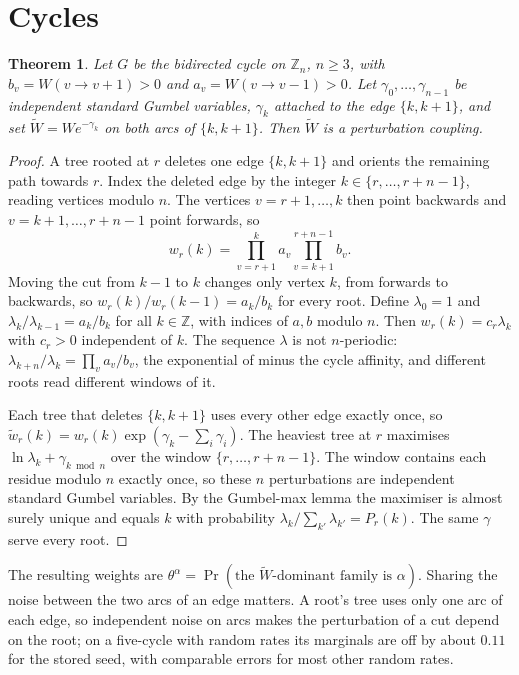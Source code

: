 \documentclass[11pt]{amsart}
\newtheorem{theorem}{Theorem}[section]
\theoremstyle{definition}
\theoremstyle{remark}
\newcommand{\Z}{\mathbb Z}
\begin{document}
\section{Cycles}

\begin{theorem}\label{thm:cycle}
Let $G$ be the bidirected cycle on $\Z_n$, $n\ge3$, with $b_v=W(v\to v+1)>0$ and $a_v=W(v\to v-1)>0$. Let $\gamma_0,\dots,\gamma_{n-1}$ be independent standard Gumbel variables, $\gamma_k$ attached to the edge $\{k,k+1\}$, and set $\widetilde W=We^{-\gamma_k}$ on both arcs of $\{k,k+1\}$. Then $\widetilde W$ is a perturbation coupling.
\end{theorem}

\begin{proof}
A tree rooted at $r$ deletes one edge $\{k,k+1\}$ and orients the remaining path towards $r$. Index the deleted edge by the integer $k\in\{r,\dots,r+n-1\}$, reading vertices modulo $n$. The vertices $v=r+1,\dots,k$ then point backwards and $v=k+1,\dots,r+n-1$ point forwards, so
\[
 w_r(k)=\prod_{v=r+1}^{k}a_v\prod_{v=k+1}^{r+n-1}b_v .
\]
Moving the cut from $k-1$ to $k$ changes only vertex $k$, from forwards to backwards, so $w_r(k)/w_r(k-1)=a_k/b_k$ for every root. Define $\lambda_0=1$ and $\lambda_k/\lambda_{k-1}=a_k/b_k$ for all $k\in\Z$, with indices of $a,b$ modulo $n$. Then $w_r(k)=c_r\lambda_k$ with $c_r>0$ independent of $k$. The sequence $\lambda$ is not $n$-periodic: $\lambda_{k+n}/\lambda_k=\prod_v a_v/b_v$, the exponential of minus the cycle affinity, and different roots read different windows of it.

Each tree that deletes $\{k,k+1\}$ uses every other edge exactly once, so $\widetilde w_r(k)=w_r(k)\exp(\gamma_k-\sum_i\gamma_i)$. The heaviest tree at $r$ maximises $\ln\lambda_k+\gamma_{k\bmod n}$ over the window $\{r,\dots,r+n-1\}$. The window contains each residue modulo $n$ exactly once, so these $n$ perturbations are independent standard Gumbel variables. By the Gumbel-max lemma \cite{Yellott1977} the maximiser is almost surely unique and equals $k$ with probability $\lambda_k/\sum_{k'}\lambda_{k'}=P_r(k)$. The same $\gamma$ serve every root.
\end{proof}

The resulting weights are $\theta^\alpha=\Pr(\text{the }\widetilde W\text{-dominant family is }\alpha)$. Sharing the noise between the two arcs of an edge matters. A root's tree uses only one arc of each edge, so independent noise on arcs makes the perturbation of a cut depend on the root; on a five-cycle with random rates its marginals are off by about $0.11$ for the stored seed, with comparable errors for most other random rates.
\end{document}
